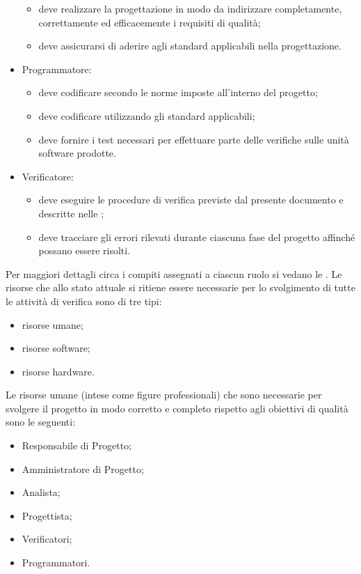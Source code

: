 \begin{itemize}
\begin{itemize}
					\item deve realizzare la progettazione in modo da indirizzare completamente, correttamente ed efficacemente i requisiti di qualità;
					\item deve assicurarsi di aderire agli standard applicabili nella progettazione.
				\end{itemize}
				\item Programmatore:
				\begin{itemize}
					\item deve codificare secondo le norme imposte all'interno del progetto;
					\item deve codificare utilizzando gli standard applicabili;
					\item deve fornire i test necessari per effettuare parte delle verifiche sulle unità software prodotte.
				\end{itemize}
				\item Verificatore:
				\begin{itemize}
					\item deve eseguire le procedure di verifica previste dal presente documento e descritte nelle ;
					\item deve tracciare gli errori rilevati durante ciascuna fase del progetto affinché possano essere risolti.
				\end{itemize}
			\end{itemize}
			Per maggiori dettagli circa i compiti assegnati a ciascun ruolo si vedano le .
				Le risorse che allo stato attuale si ritiene essere necessarie per lo svolgimento di tutte le attività di verifica 
				sono di tre tipi:
				\begin{itemize}
					\item risorse umane;
					\item risorse software;
					\item risorse hardware.
				\end{itemize}
					Le risorse umane (intese come figure professionali) che sono necessarie per svolgere il progetto in modo corretto e completo 
					rispetto agli obiettivi di qualità sono le seguenti:
					\begin{itemize}
						\item Responsabile di Progetto;
						\item Amministratore di Progetto;
						\item Analista;
						\item Progettista;
						\item Verificatori;
						\item Programmatori.
					\end{itemize}
